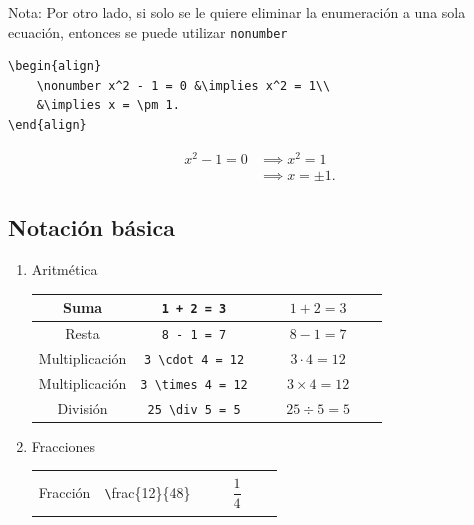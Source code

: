 \documentclass[../notes.tex]{subfiles}
\begin{document}
        Nota: Por otro lado, si solo se le quiere eliminar la enumeración a una sola ecuación, entonces se puede utilizar \texttt{nonumber}
                \begin{verbatim}
\begin{align}
    \nonumber x^2 - 1 = 0 &\implies x^2 = 1\\
    &\implies x = \pm 1.
\end{align}
            \end{verbatim}
    \begin{align}
        \nonumber  x^2 - 1 = 0 &\implies x^2 = 1\\
        &\implies x = \pm 1.
    \end{align}
    
    \subsection{Notación básica}
    
        \begin{enumerate}
            \item Aritmética
                \begin{center}
                \begin{tabular}{|c|c|c|}
                \hline
                    Suma & \texttt{1 + 2 = 3} & $\quad\quad1 + 2 = 3\quad\quad$\\
                \hline
                    Resta & \texttt{8 - 1 = 7} & $8 - 1 = 7$\\
                \hline
                    Multiplicación & \texttt{3 \textbackslash cdot 4 = 12} & $3 \cdot 4 = 12$\\
                \hline
                    Multiplicación & \texttt{3 \textbackslash times 4 = 12} & $3 \times 4 = 12$\\
                \hline
                    División & \texttt{25 \textbackslash div 5 = 5} & $25 \div 5 = 5$\\
                \hline
                \end{tabular}
                \end{center}
            \item Fracciones
                \begin{center}
                \begin{tabular}{|c|c|c|}
                \hline
                    & & \\
                    Fracción & \texttt \textbackslash frac\{12\}\{48\} & $\quad\quad\dfrac{1}{4}\quad\quad$ \\
                    & & \\
                \hline
                \end{tabular}
                \end{center}
        \end{enumerate}
\end{document}
